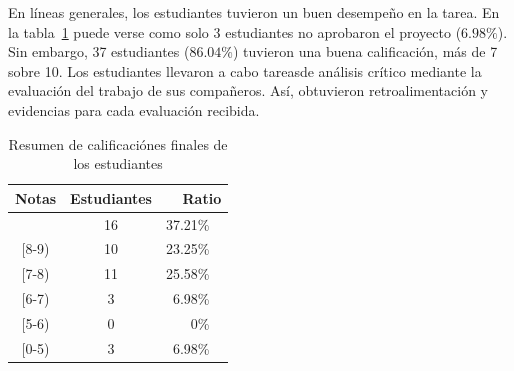 En líneas generales, los estudiantes tuvieron un buen desempeño en la tarea. En la tabla~\ref{table:summary-theory} puede verse como solo 3 estudiantes no aprobaron el proyecto ($6.98\%$). Sin embargo, 37 estudiantes ($86.04\%$) tuvieron una buena calificación, más de 7 sobre 10. Los estudiantes llevaron a cabo tareasde análisis crítico mediante la evaluación del trabajo de sus compañeros. Así, obtuvieron retroalimentación y evidencias para cada evaluación recibida.

\begin{table}[h]
\centering
\begin{tabular}{|c|c|r|}
\hline
\textbf{Notas} & \textbf{Estudiantes} & \textbf{Ratio}   \\ \hline
\hline
 [9-10] & 16 & 37.21\% ~ \\ \hline
 [8-9) & 10 & 23.25\% ~ \\ \hline
 [7-8) & 11 & 25.58\% ~ \\ \hline
 [6-7) & 3 & 6.98\% ~ \\ \hline
 [5-6) & 0 & 0\% ~ \\ \hline
 [0-5) & 3 & 6.98\% ~ \\ \hline
\end{tabular}
\caption{Resumen de calificaciónes finales de los estudiantes}
\label{table:summary-theory}
\end{table}




